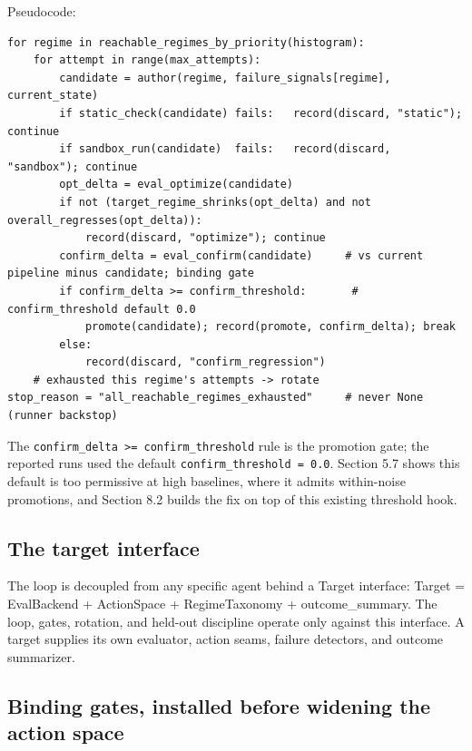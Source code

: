 Pseudocode:

\begin{verbatim}
for regime in reachable_regimes_by_priority(histogram):
    for attempt in range(max_attempts):
        candidate = author(regime, failure_signals[regime], current_state)
        if static_check(candidate) fails:   record(discard, "static"); continue
        if sandbox_run(candidate)  fails:   record(discard, "sandbox"); continue
        opt_delta = eval_optimize(candidate)
        if not (target_regime_shrinks(opt_delta) and not overall_regresses(opt_delta)):
            record(discard, "optimize"); continue
        confirm_delta = eval_confirm(candidate)     # vs current pipeline minus candidate; binding gate
        if confirm_delta >= confirm_threshold:       # confirm_threshold default 0.0
            promote(candidate); record(promote, confirm_delta); break
        else:
            record(discard, "confirm_regression")
    # exhausted this regime's attempts -> rotate
stop_reason = "all_reachable_regimes_exhausted"     # never None (runner backstop)
\end{verbatim}

The \texttt{confirm\_delta >= confirm\_threshold} rule is the promotion gate; the reported runs used the default \texttt{confirm\_threshold = 0.0}. Section 5.7 shows this default is too permissive at high baselines, where it admits within-noise promotions, and Section 8.2 builds the fix on top of this existing threshold hook.

\subsection{The target interface}

The loop is decoupled from any specific agent behind a Target interface: Target = EvalBackend + ActionSpace + RegimeTaxonomy + outcome\_summary. The loop, gates, rotation, and held-out discipline operate only against this interface. A target supplies its own evaluator, action seams, failure detectors, and outcome summarizer.

\subsection{Binding gates, installed before widening the action space}

